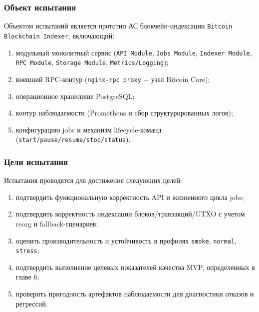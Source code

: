 ﻿\documentclass[14pt,a4paper]{extarticle}
\begin{document}
\subsubsection{Объект испытания}
\noindent Объектом испытаний является прототип АС блокчейн-индексации \texttt{Bitcoin Blockchain Indexer}, включающий:
\begin{enumerate}
  \item модульный монолитный сервис (\texttt{API Module}, \texttt{Jobs Module}, \texttt{Indexer Module}, \texttt{RPC Module}, \texttt{Storage Module}, \texttt{Metrics/Logging});
  \item внешний RPC-контур (\texttt{nginx-rpc proxy} + узел Bitcoin Core);
  \item операционное хранилище PostgreSQL;
  \item контур наблюдаемости (Prometheus и сбор структурированных логов);
  \item конфигурацию jobs и механизм lifecycle-команд (\texttt{start/pause/resume/stop/status}).
\end{enumerate}

\subsubsection{Цели испытания}
\noindent Испытания проводятся для достижения следующих целей:
\begin{enumerate}
  \item подтвердить функциональную корректность API и жизненного цикла jobs;
  \item подтвердить корректность индексации блоков/транзакций/UTXO с учетом reorg и fallback-сценариев;
  \item оценить производительность и устойчивость в профилях \texttt{smoke}, \texttt{normal}, \texttt{stress};
  \item подтвердить выполнение целевых показателей качества MVP, определенных в главе 6;
  \item проверить пригодность артефактов наблюдаемости для диагностики отказов и регрессий.
\end{enumerate}
\end{document}
